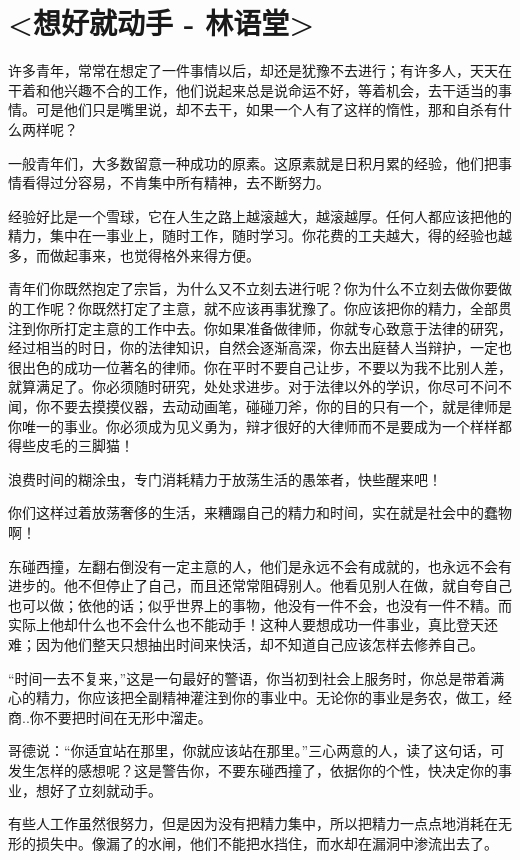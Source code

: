 \documentclass[UTF8,a4paper,8pt]{ctexbook}
\begin{document}
	\section{<想好就动手 - 林语堂>}	
		许多青年，常常在想定了一件事情以后，却还是犹豫不去进行；有许多人，天天在干着和他兴趣不合的工作，他们说起来总是说命运不好，等着机会，去干适当的事情。可是他们只是嘴里说，却不去干，如果一个人有了这样的惰性，那和自杀有什么两样呢？
		
		
		一般青年们，大多数留意一种成功的原素。这原素就是日积月累的经验，他们把事情看得过分容易，不肯集中所有精神，去不断努力。
		
		
		经验好比是一个雪球，它在人生之路上越滚越大，越滚越厚。任何人都应该把他的精力，集中在一事业上，随时工作，随时学习。你花费的工夫越大，得的经验也越多，而做起事来，也觉得格外来得方便。
		
		
		青年们你既然抱定了宗旨，为什么又不立刻去进行呢？你为什么不立刻去做你要做的工作呢？你既然打定了主意，就不应该再事犹豫了。你应该把你的精力，全部贯注到你所打定主意的工作中去。你如果准备做律师，你就专心致意于法律的研究，经过相当的时日，你的法律知识，自然会逐渐高深，你去出庭替人当辩护，一定也很出色的成功一位著名的律师。你在平时不要自己让步，不要以为我不比别人差，就算满足了。你必须随时研究，处处求进步。对于法律以外的学识，你尽可不问不闻，你不要去摸摸仪器，去动动画笔，碰碰刀斧，你的目的只有一个，就是律师是你唯一的事业。你必须成为见义勇为，辩才很好的大律师而不是要成为一个样样都得些皮毛的三脚猫！
		
		
		浪费时间的糊涂虫，专门消耗精力于放荡生活的愚笨者，快些醒来吧！
		
		
		你们这样过着放荡奢侈的生活，来糟蹋自己的精力和时间，实在就是社会中的蠢物啊！
		
		
		东碰西撞，左翻右倒没有一定主意的人，他们是永远不会有成就的，也永远不会有进步的。他不但停止了自己，而且还常常阻碍别人。他看见别人在做，就自夸自己也可以做；依他的话；似乎世界上的事物，他没有一件不会，也没有一件不精。而实际上他却什么也不会什么也不能动手！这种人要想成功一件事业，真比登天还难；因为他们整天只想抽出时间来快活，却不知道自己应该怎样去修养自己。
		
		
		“时间一去不复来，”这是一句最好的警语，你当初到社会上服务时，你总是带着满心的精力，你应该把全副精神灌注到你的事业中。无论你的事业是务农，做工，经商..你不要把时间在无形中溜走。
		
		
		哥德说：“你适宜站在那里，你就应该站在那里。”三心两意的人，读了这句话，可发生怎样的感想呢？这是警告你，不要东碰西撞了，依据你的个性，快决定你的事业，想好了立刻就动手。
		
		
		有些人工作虽然很努力，但是因为没有把精力集中，所以把精力一点点地消耗在无形的损失中。像漏了的水闸，他们不能把水挡住，而水却在漏洞中渗流出去了。
\end{document}
